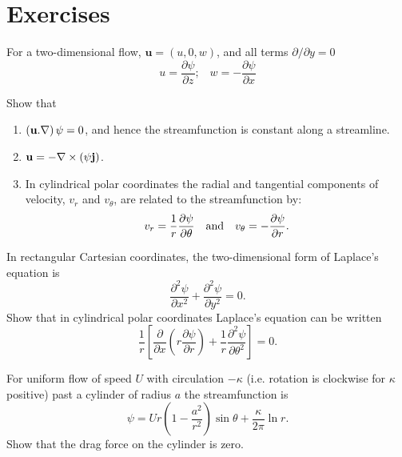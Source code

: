 \documentclass[10pt]{report}
\begin{document}
\divider
\pagebreak

\section{Exercises}
\begin{questionstar}
For a two-dimensional flow, ${\bm u}=(u,0,w)$, and all terms $\partial/ \partial y = 0$
\begin{equation*}
	u = \frac{\partial \psi}{\partial z}; \;\;\; w = -\frac{\partial \psi}{\partial x}
\end{equation*}

Show that

\begin{enumerate}
	\item $\left( {{{\bf u}}. \nabla } \right)\psi =0$, and hence the streamfunction is constant along a streamline.

	\item ${{\bf u}}=-\nabla \times \left( {\psi {{\bf j}}}
	\right)$.

	\item In cylindrical polar coordinates the radial and tangential
	components of velocity, $v_{r}$ and $v_{\theta }$, are related to the
	streamfunction by:
	\[ v_r =\frac{1}{r}\frac{\partial \psi }{\partial \theta } \quad\hbox{and}\quad v_\theta
	=-\frac{\partial \psi }{\partial r}. \]
	\end{enumerate}
\label{qn:cylindrical-geometry}
\end{questionstar}

\begin{question}
	\newcommand{\pd}[2]{\frac{\partial {#1} }{\partial {#2}}}
	\newcommand{\ppd}[2]{\frac{\partial^{2} {#1} }{\partial {#2}^{2}}}
	\newcommand{\pppd}[2]{\frac{\partial^{3} {#1} }{\partial {#2}^{3}}}
	\newcommand{\ppdd}[3]{\frac{\partial^{2} {#1} }{\partial {#2} \partial {#3}}}

	In rectangular Cartesian coordinates, the two-dimensional form of
	Laplace's equation is
	\[ \frac{\partial ^2\psi }{\partial
	x^2}+\frac{\partial ^2\psi }{\partial y^2}=0.
	\]
	 Show that in cylindrical
	polar coordinates Laplace's equation can be written
	\[
		\frac{1}{r}\left[ {\frac{\partial }{\partial x}\left( {r\frac{\partial
		\psi }{\partial r}} \right)+\frac{1}{r}\frac{\partial ^2\psi
		}{\partial \theta ^2}} \right]=0.
	\]
\label{qn:cylindrical-laplacian}
\end{question}


\begin{question}
	 For uniform flow of speed $U$ with circulation $- \kappa$
	 (i.e. rotation is clockwise for $\kappa$ positive) past a cylinder of radius $a$
	 the streamfunction is
	 \[ \psi = Ur \left( 1 - \frac{a^2}{r^2} \right)
	 \sin \theta + \frac{\kappa}{2\pi} \ln r. \]
	Show that the drag force on the cylinder is zero.
\label{qn:cylinder-drag}


\end{question}
\end{document}
